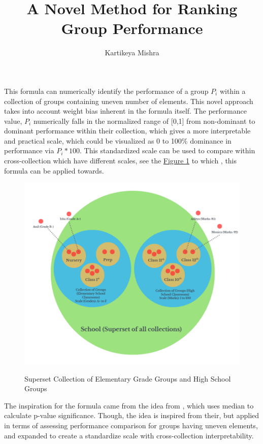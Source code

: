 \documentclass[man,floatsintext]{apa7}
\title{A \textsf{Novel} Method for Ranking Group Performance}
\author{Kartikeya Mishra}
\begin{document}
\maketitle
This formula can numerically identify the performance of a group $P_i$ within a collection of groups containing uneven number of elements. This novel approach takes into account weight bias inherent in the formula itself. The performance value, $P_i$ numerically falls in the normalized range of [0,1] from non-dominant to dominant performance within their collection, which gives a more interpretable and practical scale, which could be visualized as 0 to 100\% dominance in performance via $P_i * 100$. 
This standardized scale can be used to compare within cross-collection which have different scales, see the \hyperref[fig:superset-collection]{Figure 1} to which , this formula can be applied towards.
\begin{figure}[!htb]
    \caption{Superset Collection of Elementary Grade Groups and High School Groups}
    \centering
    \includegraphics [scale=0.5]{images/superset_collection.png}
    \label{fig:superset-collection}
\end{figure}

The inspiration for the formula came from the idea from \cite{mann1947test}, which uses median to calculate p-value significance. Though, the idea is inspired from their, but applied in terms of assessing performance comparison
for groups having uneven elements, and expanded to create a standardize scale with cross-collection interpretability.
\end{document}
